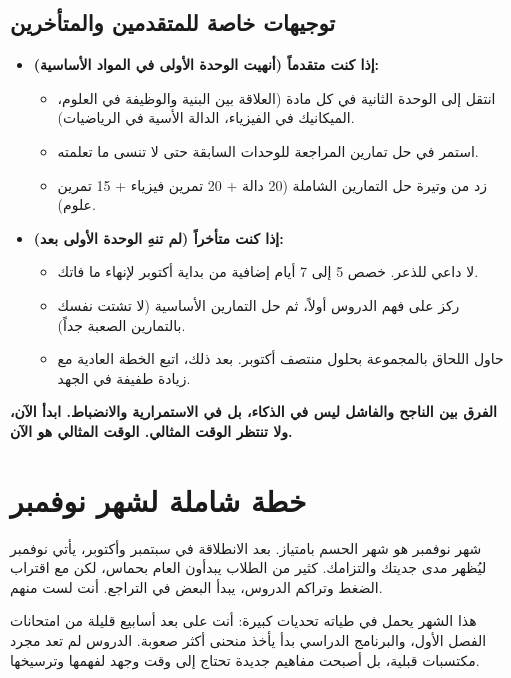 \documentclass[12pt,a4paper]{book}
\newcommand{\importantAr}[1]{%
	\begin{important}
		\bfseries #1
	\end{important}
}
\begin{document}
	\subsection{توجيهات خاصة للمتقدمين والمتأخرين}
	
	\begin{itemize}
		\item \textbf{إذا كنت متقدماً (أنهيت الوحدة الأولى في المواد الأساسية):}
		\begin{itemize}
			\item انتقل إلى الوحدة الثانية في كل مادة (العلاقة بين البنية والوظيفة في العلوم، الميكانيك في الفيزياء، الدالة الأسية في الرياضيات).
			\item استمر في حل تمارين المراجعة للوحدات السابقة حتى لا تنسى ما تعلمته.
			\item زد من وتيرة حل التمارين الشاملة (20 دالة + 20 تمرين فيزياء + 15 تمرين علوم).
		\end{itemize}
		
		\item \textbf{إذا كنت متأخراً (لم تنهِ الوحدة الأولى بعد):}
		\begin{itemize}
			\item لا داعي للذعر. خصص 5 إلى 7 أيام إضافية من بداية أكتوبر لإنهاء ما فاتك.
			\item ركز على فهم الدروس أولاً، ثم حل التمارين الأساسية (لا تشتت نفسك بالتمارين الصعبة جداً).
			\item حاول اللحاق بالمجموعة بحلول منتصف أكتوبر. بعد ذلك، اتبع الخطة العادية مع زيادة طفيفة في الجهد.
		\end{itemize}
	\end{itemize}
	
	\importantAr{الفرق بين الناجح والفاشل ليس في الذكاء، بل في الاستمرارية والانضباط. ابدأ الآن، ولا تنتظر الوقت المثالي. الوقت المثالي هو الآن.}
	
	\section{خطة شاملة لشهر نوفمبر}
	
	شهر نوفمبر هو شهر الحسم بامتياز. بعد الانطلاقة في سبتمبر وأكتوبر، يأتي نوفمبر ليُظهر مدى جديتك والتزامك. كثير من الطلاب يبدأون العام بحماس، لكن مع اقتراب الضغط وتراكم الدروس، يبدأ البعض في التراجع. أنت لست منهم.
	
	هذا الشهر يحمل في طياته تحديات كبيرة: أنت على بعد أسابيع قليلة من امتحانات الفصل الأول، والبرنامج الدراسي بدأ يأخذ منحنى أكثر صعوبة. الدروس لم تعد مجرد مكتسبات قبلية، بل أصبحت مفاهيم جديدة تحتاج إلى وقت وجهد لفهمها وترسيخها.
	
\end{document}
